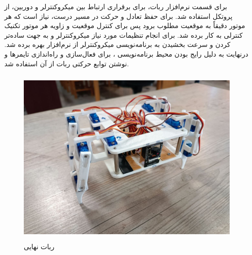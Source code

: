 \newpage
برای قسمت نرم‌افزار ربات، برای برقراری ارتباط بین میکروکنترلر و دوربین، از پروتکل  استفاده شد. برای حفظ تعادل و حرکت در مسیر درست، نیاز است که هر موتور دقیقاً به موقعیت مطلوب برود پس برای کنترل موقعیت و زاویه هر موتور تکنیک کنترلی  به کار برده شد. برای انجام تنظیمات مورد نیاز میکروکنترلر و به جهت ساده‌تر کردن و سرعت بخشیدن به برنامه‌نویسی میکروکنترلر از نرم‌افزار  بهره برده شد. درنهایت به دلیل رایج بودن محیط برنامه‌نویسی ، برای فعال‌سازی و راه‌اندازی تایمرها و نوشتن توابع حرکتی ربات از آن استفاده شد.
	\begin{figure}[!h]
	\centering
	\includegraphics[width=12cm,height=9cm]{./Images/CH5/IMG_2.jpg}
	\caption{ربات نهایی}
	\end{figure}
	
